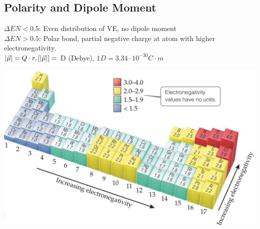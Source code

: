 \subsection{Polarity and Dipole Moment}
$\Delta EN < 0.5$: Even distribution of VE, no dipole moment\\
$\Delta EN > 0.5$: Polar bond, partial negative charge at atom with higher electronegativity.\\
$\abs{\vec{\mu}} = Q \cdot r, [\abs{\vec{\mu}}] =$ D (Debye), $1D = 3.34 \cdot 10^{-30} C\cdot m$
\begin{center}
    \includegraphics[width = 0.8\linewidth]{images/electronegativity.jpeg}
\end{center}
